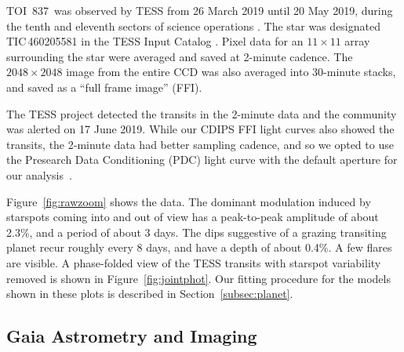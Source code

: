\documentclass[12pt,twocolumn,tighten]{aastex63}
\newcommand{\tn}{TOI~837} %
\begin{document}
\tn\ was observed by TESS from 26 March 2019 until 20 May 2019, during
the tenth and eleventh sectors of science operations
\citep{ricker_transiting_2015}.  The star was designated
TIC\,460205581 in the TESS Input Catalog
\citep{stassun_TIC_2018,stassun_TIC8_2019}.  Pixel data for an
$11\times11$ array surrounding the star were averaged and saved at
2-minute cadence.  The $2048\times2048$ image from the entire CCD was
also averaged into 30-minute stacks, and saved as a ``full frame
image'' (FFI).

The TESS project detected the transits in the 2-minute data and the
community was alerted on 17 June 2019.  While our CDIPS FFI light
curves also showed the transits, the 2-minute data had better sampling
cadence, and so we opted to use the Presearch Data Conditioning (PDC)
light curve with the default aperture for our
analysis~\citep{smith_kepler_2012,stumpe_multiscale_2014,jenkins_tess_2016,smith_finding_2016}.

Figure~\ref{fig:rawzoom} shows the data.  The dominant modulation
induced by starspots coming into and out of view has a peak-to-peak
amplitude of about 2.3\%, and a period of about 3 days.  The dips
suggestive of a grazing transiting planet recur roughly every 8 days,
and have a depth of about 0.4\%.  A few flares are visible.  A
phase-folded view of the TESS transits with starspot variability
removed is shown in Figure~\ref{fig:jointphot}. Our fitting procedure
for the models shown in these plots is described in
Section~\ref{subsec:planet}.





\subsection{Gaia Astrometry and Imaging}
\label{subsec:gaia}
\end{document}
